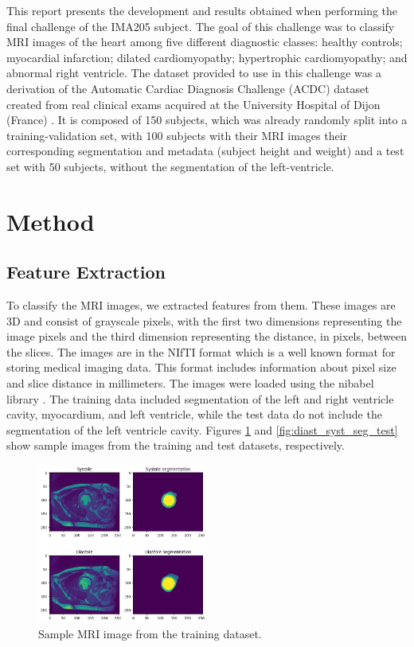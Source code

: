 \documentclass[conference]{IEEEtran}
\begin{document}
    This report presents the development and results obtained when performing the final challenge
    of the IMA205 subject. The goal of this challenge was to classify MRI images of the heart among five
    different diagnostic classes: healthy controls; myocardial infarction; dilated cardiomyopathy;
    hypertrophic cardiomyopathy; and abnormal right ventricle. The dataset provided to use in this challenge 
    was a derivation of the Automatic Cardiac Diagnosis Challenge (ACDC) dataset created from real clinical 
    exams acquired at the University Hospital of Dijon (France) \cite{Bernard2018}. It is composed of 150
    subjects, which was already randomly split into a training-validation set, with 100 subjects with
    their MRI images their corresponding segmentation and metadata (subject height and weight) and a 
    test set with 50 subjects, without the segmentation of the left-ventricle.

\section{Method}

\subsection{Feature Extraction}

    To classify the MRI images, we extracted features from them. These images are 3D and consist of 
    grayscale pixels, with the first two dimensions representing the image pixels and the third dimension 
    representing the distance, in pixels, between the slices. The images are in the NIfTI format which is 
    a well known format for storing medical imaging data. This format includes information about pixel size
    and slice distance in millimeters. The images were loaded using the nibabel library \cite{nibabel}.
    The training data included segmentation of the left and right ventricle cavity, myocardium, 
    and left ventricle, while the test data do not include the segmentation of the left ventricle cavity.
    Figures \ref{fig:diast_syst_seg_train} and \ref{fig:diast_syst_seg_test} show sample images from the
    training and test datasets, respectively.

    \begin{figure}[!ht]
    \centering
    \includegraphics[width=0.5\textwidth]{images/diast_syst_seg_train.png}
    \caption{Sample MRI image from the training dataset.}
    \label{fig:diast_syst_seg_train}
    \end{figure}
\end{document}

